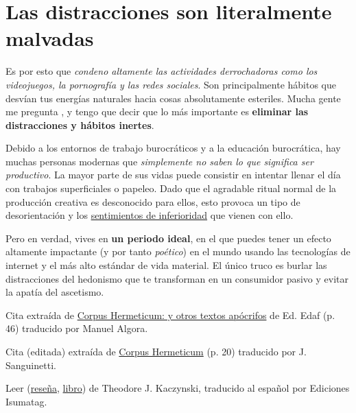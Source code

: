 \documentclass{article}
\begin{document}
	\section*{Las distracciones son literalmente malvadas}

	Es por esto que \textit{condeno altamente las actividades derrochadoras como
	los videojuegos, la pornografía y las redes sociales}. Son
	principalmente hábitos que desvían tus energías naturales hacia cosas
	absolutamente esteriles. Mucha gente me pregunta , y tengo que decir que lo más importante
	es \textbf{eliminar las distracciones y hábitos inertes}.

	Debido a los entornos de trabajo burocráticos y a la educación
	burocrática, hay muchas personas modernas que \textit{simplemente no
	saben lo que significa ser productivo}. La mayor parte de sus vidas
	puede consistir en intentar llenar el día con trabajos superficiales
	o papeleo. Dado que el agradable ritual normal de la producción creativa
	es desconocido para ellos, esto provoca un tipo de desorientación y los
	\href{https://lukesmith.xyz/files/unabomber.pdf}{sentimientos de
	inferioridad} \cite{tres} que vienen con ello.

	Pero en verdad, vives en \textbf{un periodo ideal}, en el que puedes
	tener un efecto altamente impactante (y por tanto \textit{poético}) en
	el mundo usando las tecnologías de internet y el más alto estándar de
	vida material. El único truco es burlar las distracciones del hedonismo
	que te transforman en un consumidor pasivo y evitar la apatía del
	ascetismo.

	\renewcommand\refname{\large{Notas del traductor}}

	\begin{thebibliography}{9}
		 Cita extraída de
		\href{https://books.google.com.co/books/about/Corpus_Hermeticum.html?hl=es&id=It8Jo57qFVgC}
		{Corpus Hermeticum: y otros textos apócrifos} de Ed. Edaf
		(p. 46) traducido por Manuel Algora.
		
		 Cita (editada) extraída de
		\href{http://www.ricardoego.com/libros/Corpus%20Hermeticum%20-%20Trismegisto%20Hermes.pdf}
		{Corpus Hermeticum} (p. 20) traducido por J. Sanguinetti. 

		 Leer 
		(\href{https://isumatag.blogspot.com/p/la-sociedad-industrial-y-su-futuro.html}
		{reseña},
		\href{http://libgen.rs/book/index.php?md5=F50ABA1457C931AA22DD7BC84D5A90C9}
		{libro}) de Theodore J. Kaczynski, traducido al español por
		Ediciones Isumatag.
	\end{thebibliography}
\end{document}
